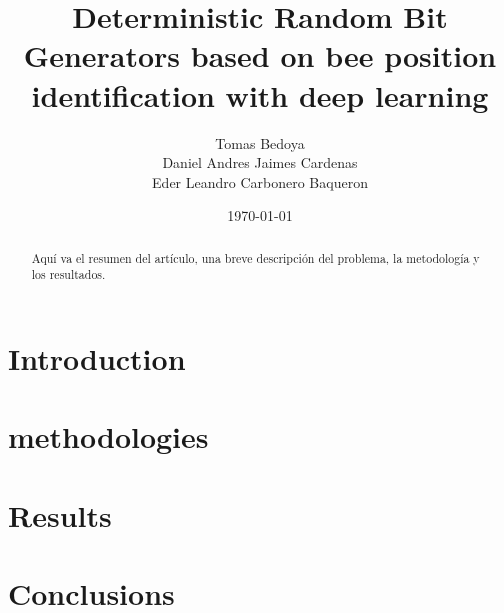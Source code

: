 \documentclass[conference]{IEEEtran}
\title{Deterministic Random Bit Generators based on bee position identification with deep learning}
\author{Tomas Bedoya \\
Daniel Andres Jaimes Cardenas  \\
Eder Leandro Carbonero Baqueron \\}
\date{\today}
\begin{document}
\maketitle
\begin{abstract}
Aquí va el resumen del artículo, una breve descripción del problema, la metodología y los resultados.
\end{abstract}

\section{Introduction}


\section{methodologies}


\section{Results}


\section{Conclusions}




\end{document}
